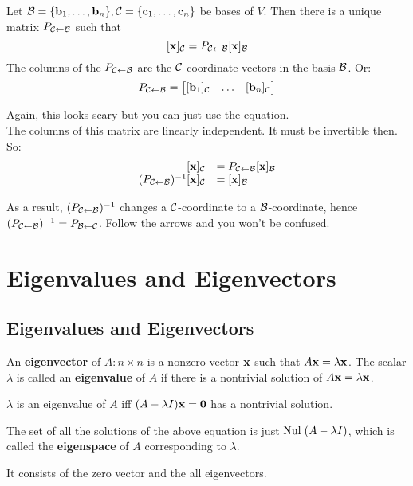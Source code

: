 \documentclass{report}
\begin{document}
\begin{theorem}
    Let $\mathcal{B} = \{\mathbf{b}_1, \ldots, \mathbf{b}_n\}, \mathcal{C} = \{\mathbf{c}_1, \ldots, \mathbf{c}_n\}$ be
    bases of $V$. Then there is a unique matrix $P_{\mathcal{C} \leftarrow \mathcal{B}}$ such that \[
    [\mathbf{x}]_{\mathcal{C}} = P_{\mathcal{C} \leftarrow \mathcal{B}} [\mathbf{x}]_{\mathcal{B}}
    \]
    The columns of the $P_{\mathcal{C} \leftarrow \mathcal{B}}$ are the $\mathcal{C}$-coordinate vectors in the basis $\mathcal{B}$. Or:\[
    P_{\mathcal{C} \leftarrow \mathcal{B}} = \begin{bmatrix}
        [\mathbf{b}_1]_{\mathcal{C}} & \ldots & [\mathbf{b}_n]_{\mathcal{C}}
    \end{bmatrix}
    \]
\end{theorem}

Again, this looks scary but you can just use the equation.\\

The columns of this matrix are linearly independent. It must be invertible then.
So:
\[
    \begin{array}{rlr}
        [\mathbf{x}]_{\mathcal{C}} &= P_{\mathcal{C} \leftarrow \mathcal{B}} [\mathbf{x}]_{\mathcal{B}} \\
        (P_{\mathcal{C} \leftarrow \mathcal{B}})^{-1} [\mathbf{x}]_{\mathcal{C}} &= [\mathbf{x}]_{\mathcal{B}}
    \end{array}
\]

As a result, $(P_{\mathcal{C} \leftarrow \mathcal{B}})^{-1}$ changes a $\mathcal{C}$-coordinate to a $\mathcal{B}$-coordinate,
hence $(P_{\mathcal{C} \leftarrow \mathcal{B}})^{-1} = P_{\mathcal{B} \leftarrow \mathcal{C}}$. Follow the arrows and you won't be confused.

\chapter{Eigenvalues and Eigenvectors}
\setcounter{theorem}{0}
\setcounter{definition}{0}

\section{Eigenvalues and Eigenvectors}

\begin{definition}
    An \textbf{eigenvector} of $A: n \times n$ is a nonzero vector $\mathbf{x}$ 
    such that $A \mathbf{x} = \lambda \mathbf{x}$. The scalar $\lambda$ is called an 
    \textbf{eigenvalue} of $A$ if there is a nontrivial solution of $A \mathbf{x} = \lambda \mathbf{x}$.
\end{definition}

$\lambda$ is an eigenvalue of $A$ iff $(A - \lambda I) \mathbf{x} = \mathbf{0}$ has a nontrivial solution.

The set of all the solutions of the above equation is just $\mathrm{Nul}\; (A - \lambda I)$, which is called the
\textbf{eigenspace} of $A$ corresponding to $\lambda$. 

It consists of the zero vector and the all eigenvectors.
\end{document}
